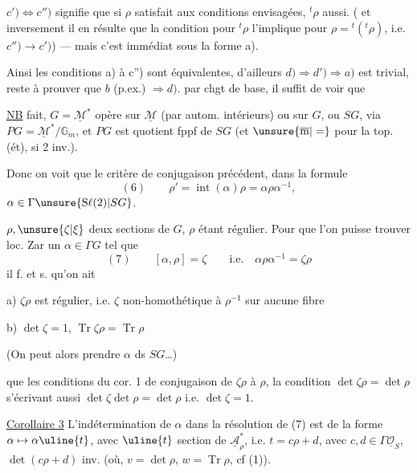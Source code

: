 $c')\Longleftrightarrow c'')$ signifie que si $\rho$ satisfait aux conditions envisagées, ${}^t\rho$ aussi. ( et inversement il en résulte que la condition pour ${}^t\rho$ l'implique pour $\rho={}^t({}^t\rho)$\deleted{\unsure{$\}$}}, i.e. $c'')\longrightarrow c')$) --- mais c'est immédiat sous la forme a).

Ainsi les conditions a) à c'') sont équivalentes, d'ailleurs $d)\Longrightarrow d')\Longrightarrow a)$ est trivial, reste à prouver que $b$ (p.ex.) $\Rightarrow d)$.
 par chgt de base, il suffit de voir que




\uline{NB}\quad {} fait, $G=\underline{\mathcal M}^{*}$ opère sur $\underline{\mathcal M}$ (par autom. intérieurs) ou sur $G$, ou $SG$, via $PG=\underline{\mathcal M}^{*}/\mathbb G_m$, et $PG$ est quotient fppf de $SG$ (et $\unsure{\overline{\mathrm m}|=}$ pour la top. (ét), si 2 inv.).

Donc on voit que  le critère de conjugaison précédent, dans la formule
\[
(6)\qquad \rho'=\operatorname{int}(\alpha)\rho=\alpha\rho\alpha^{-1},
\]
 $\alpha\in\Gamma\unsure{\mathrm S\ell(2)|SG}$.

 $\rho,\unsure{\zeta|\xi}$ deux sections de $G$, $\rho$ étant régulier. Pour que l'on puisse trouver loc. Zar un $\alpha\in\Gamma G$ tel que
\[
(7)\qquad [\alpha,\rho]=\zeta\qquad\text{i.e.}\quad \alpha\rho\alpha^{-1}=\zeta\rho
\]
il f. et s. qu'on ait

a) $\zeta\rho$ est régulier, i.e. $\zeta$ \deleted{$\unsure{\neq}$} non-homothétique à $\rho^{-1}$ sur aucune fibre

b) $\det\zeta=1$, $\operatorname{Tr}\zeta\rho=\operatorname{Tr}\rho$

(On peut alors prendre $\alpha$ ds $SG$\ldots)

 que les conditions du cor. 1  de conjugaison de $\zeta\rho$ à $\rho$, la condition $\det\zeta\rho=\det\rho$ s'écrivant aussi $\det\zeta\det\rho=\det\rho$ i.e. $\det\zeta=1$.

\uline{Corollaire 3} L'indétermination de $\alpha$ dans la résolution de (7) est de la forme $\alpha\mapsto\alpha\uline{t}$, avec $\uline{t}$ section de $\underline{\mathcal A}_\rho^*$, i.e. $t=c\rho+d$, avec $c,d\in\Gamma\underline{\mathcal O}_S$, $\det(c\rho+d)$ inv.
(où, $v=\det\rho$, $w=\operatorname{Tr}\rho$, cf (1)).

